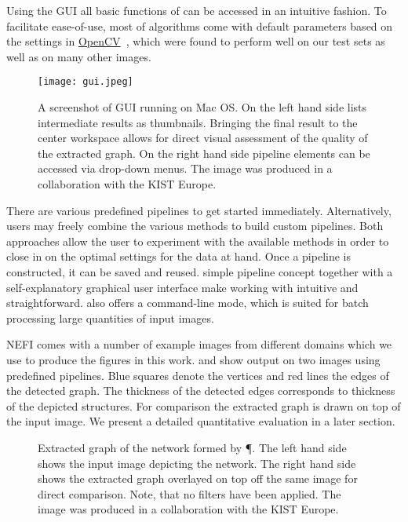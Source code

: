 	Using the GUI all basic functions of \NEFI can be accessed in an intuitive fashion. To facilitate ease-of-use, most of \NEFIs algorithms come with default parameters based on the settings in \href{http://opencv.org/}{OpenCV}~\cite{opencv}, which were found to perform well on our test sets as well as on many other images.

	\begin{figure}
		\centering
		\texttt{[image: gui.jpeg]}
		\caption[\NEFIs graphical user interface.]{A screenshot of \NEFIs GUI running on Mac OS. On the left hand side \NEFI lists intermediate results as thumbnails. Bringing the final result to the center workspace allows for direct visual assessment of the quality of the extracted graph. On the right hand side \NEFIs pipeline elements can be accessed via drop-down menus. The image was produced in a collaboration with the KIST Europe.}
		\label{fig:nefi_gui}
	\end{figure}

	There are various predefined pipelines to get started immediately. Alternatively, users may freely combine the various methods to build custom pipelines. Both approaches allow the user to experiment with the available methods in order to close in on the optimal settings for the data at hand. Once a pipeline is constructed, it can be saved and reused. \NEFIs simple pipeline concept together with a self-explanatory graphical user interface make working with \NEFI intuitive and straightforward. \NEFI also offers a command-line mode, which is suited for batch processing large quantities of input images.

	NEFI comes with a number of example images from different domains which we use to produce the figures in this work.  and  show \NEFIs output on two images using predefined pipelines. Blue squares denote the vertices and red lines the edges of the detected graph. The thickness of the detected edges corresponds to thickness of the depicted structures. For comparison the extracted graph is drawn on top of the input image. We present a detailed quantitative evaluation in a later section.


	\begin{figure}
		\centering
		\caption[\P: Input and output of \NEFI]{Extracted graph of the network formed by \P. The left hand side shows the input image depicting the network. The right hand side shows the extracted graph overlayed on top off the same image for direct comparison. Note, that no filters have been applied. The image was produced in a collaboration with the KIST Europe.}
		\label{fig:physarum}
	\end{figure}

